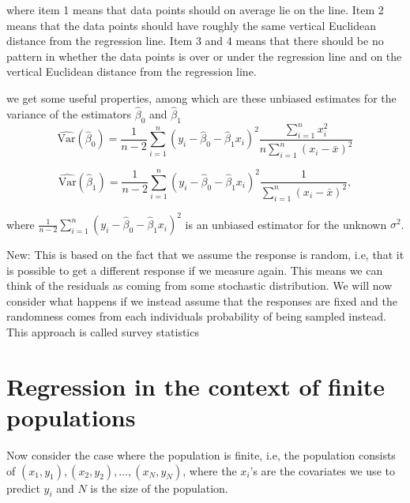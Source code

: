 \documentclass{article}
\begin{document}


where item 1 means that data points should on average lie on the line.
Item 2 means that the data points should have roughly the same vertical
Euclidean distance from the regression line.
Item 3 and 4 means that there should be no pattern in whether the data points is over
or under the regression line and on the vertical Euclidean distance from the
regression line.

we get some useful properties, among which are these unbiased estimates for the
variance of the estimators \(\hat{\beta}_0\) and \(\hat{\beta}_1\)
\begin{equation*}
 \widehat{\mathrm{Var}} \left( \hat{\beta}_0 \right) = \frac{1}{n - 2} \sum_{i = 1}^n\left( y_i - \hat{\beta}_0 -
 \hat{\beta}_1 x_i \right)^2 \frac{\sum_{i = 1}^n x_i^2}{n
   \sum_{i = 1}^n \left( x_i - \bar{x} \right)^2}
\end{equation*}
 

\begin{equation*}
 \widehat{\mathrm{Var}} \left( \hat{\beta}_1 \right) = \frac{1}{n - 2} \sum_{i = 1}^n\left( y_i - \hat{\beta}_0 -
 \hat{\beta}_1 x_i \right)^2\frac{1}{
   \sum_{i = 1}^n \left( x_i - \bar{x} \right)^2},
\end{equation*}

where \(\frac{1}{n - 2} \sum_{i = 1}^n\left( y_i - \hat{\beta}_0 -
 \hat{\beta}_1 x_i \right)^2\) is an
unbiased estimator for the unknown \(\sigma^2\).

New: This is based on the fact that we assume the response is random, i.e, that
it is possible to get a different response if we measure again. This means we
can think of the residuals as coming from some stochastic distribution. We will
now consider what happens if we instead assume that the responses are fixed and the
randomness comes from each individuals probability of being sampled instead.
This approach is called survey statistics


\section{Regression in the context of finite populations} \label{sec:RegFinPop}
Now consider the case where the population is finite, i.e, the population
consists of \((x_1, y_1),
(x_2, y_2), \dots , (x_N, y_N)\), where the \(x_i\)'s are the covariates we use to
predict \(y_i\) and \(N\) is the size of the population.
\end{document}
